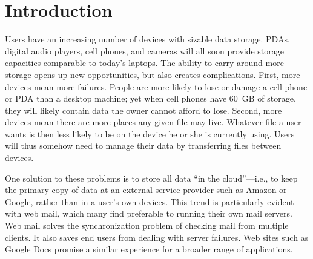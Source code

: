 
\section{Introduction}

%
%

Users have an increasing number of devices with sizable data storage.
PDAs, digital audio players, cell phones, and cameras will all soon
provide storage capacities comparable to today's laptops.  The ability
to carry around more storage opens up new opportunities, but also
creates complications.  First, more devices mean more failures.
People are more likely to lose or damage a cell phone or PDA than a
desktop machine; yet when cell phones have 60~GB of storage, they will
likely contain data the owner cannot afford to lose.  Second, more
devices mean there are more places any given file may live. Whatever
file a user wants is then less likely to be on the device he or she is
currently using.  Users will thus somehow need to manage their data by
transferring files between devices.

One solution to these problems is to store all data ``in the
cloud''---i.e., to keep the primary copy of data at an external
service provider such as Amazon or Google, rather than in a user's own
devices.  This trend is particularly evident with web mail, which many
find preferable to running their own mail servers.  Web mail solves
the synchronization problem of checking mail from multiple clients.
It also saves end users from dealing with server failures.  Web sites
such as Google Docs promise a similar experience for a broader range
of applications.

